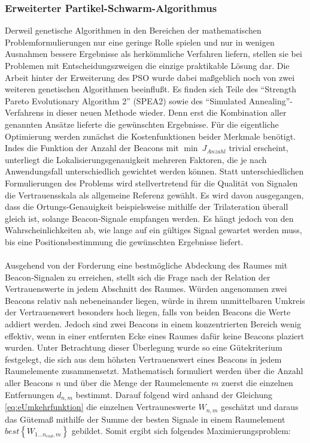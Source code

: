 \subsubsection{Erweiterter Partikel-Schwarm-Algorithmus}
Derweil genetische Algorithmen in den Bereichen der mathematischen Problemformulierungen nur eine geringe Rolle spielen und nur in wenigen Ausnahmen bessere Ergebnisse als herkömmliche Verfahren liefern, stellen sie bei Problemen mit Entscheidungszweigen die einzige praktikable Lösung dar. Die Arbeit hinter der Erweiterung des PSO wurde dabei maßgeblich noch von zwei weiteren genetischen Algorithmen beeinflußt. Es finden sich Teile des "`Strength Pareto Evolutionary Algorithm 2"' (SPEA2) \cite{SPEA2} sowie des "`Simulated Annealing"'-Verfahrens \cite{SimAnn} in dieser neuen Methode wieder. Denn erst die Kombination aller genannten Ansätze lieferte die gewünschten Ergebnisse. Für die eigentliche Optimierung werden zunächst die Kostenfunktionen beider Merkmale benötigt. Indes die Funktion der Anzahl der Beacons mit $\min \: J_{Anzahl}$ trivial erscheint, unterliegt die Lokalisierungsgenauigkeit mehreren Faktoren, die je nach Anwendungsfall unterschiedlich gewichtet werden können. Statt unterschiedlichen Formulierungen des Problems wird stellvertretend für die Qualität von Signalen die Vertrauensskala als allgemeine Referenz gewählt. Es wird davon ausgegangen, dass die Ortungs-Genauigkeit beispielsweise mithilfe der Trilateration überall gleich ist, solange Beacon-Signale empfangen werden. Es hängt jedoch von den Wahrscheinlichkeiten ab, wie lange auf ein gültiges Signal gewartet werden muss, bis eine Positionsbestimmung die gewünschten Ergebnisse liefert. \\ \\
Ausgehend von der Forderung eine bestmögliche Abdeckung des Raumes mit Beacon-Signalen zu erreichen, stellt sich die Frage nach der Relation der Vertrauenswerte in jedem Abschnitt des Raumes. Würden angenommen zwei Beacons relativ nah nebeneinander liegen, würde in ihrem unmittelbaren Umkreis der Vertrauenswert besonders hoch liegen, falls von beiden Beacons die Werte addiert werden. Jedoch sind zwei Beacons in einem konzentrierten Bereich wenig effektiv, wenn in einer entfernten Ecke eines Raumes dafür keine Beacons plaziert wurden. Unter Betrachtung dieser Überlegung wurde so eine Gütekriterium festgelegt, die sich aus dem höhsten Vertrauenswert eines Beacons in jedem Raumelemente zusammensetzt. Mathematisch formuliert werden über die Anzahl aller Beacons $n$ und über die Menge der Raumelemente $m$ zuerst die einzelnen Entfernungen $d_{n,m}$ bestimmt. Darauf folgend wird anhand der Gleichung \ref{eq:eUmkehrfunktion} die einzelnen Vertrauneswerte $W_{n,m}$ geschätzt und daraus das Gütemaß mithilfe der Summe der besten Signale in einem Raumelement $best\left \{ W_{1...n_{end},m} \right \} $ gebildet. Somit ergibt sich folgendes Maximierungsproblem:  
